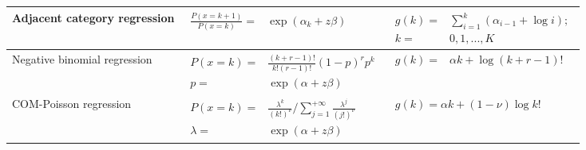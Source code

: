 \documentclass[16pt,presentation]{beamer}
\begin{document}
\begin{frame}
\begin{centering}
{\begin{tabular}{ lll}
  \parbox{0.2\textwidth}{Adjacent category regression }  
   & $\begin{aligned}\frac{P(x = k+1)}{P(x = k)} =& \exp(\alpha_k + z\beta)\end{aligned}$ & $\begin{aligned} g(k) =& \sum_{i = 1}^{k} (\alpha_{i - 1} + \log{i});\\ k =& 0,1,...,K \end{aligned}$\\
    \hline
  \parbox{0.2\textwidth}{Negative binomial regression}&  $\begin{aligned}P(x = k) =& \frac{(k+r-1)!}{k!(r-1)!}(1-p)^r p^k \\ p =& \exp (\alpha + z\beta) \end{aligned}$ & $\begin{aligned} g(k) =& \alpha k + \log{(k+r-1)!} \end{aligned}$\\
\hline
\parbox{0.2\textwidth}{COM-Poisson regression} & $\begin{aligned} P(x = k) =& \frac{\lambda^k}{(k!)^{\nu}} / \sum_{j=1}^{+\infty} \frac{\lambda^j}{(j!)^{\nu}} \\ \lambda =& \exp(\alpha + z \beta) \end{aligned}$ &
$\begin{aligned} g(k) = \alpha k + (1-\nu) \log{k!} \end{aligned}$ \\
  \hline
\end{tabular}
}
\end{centering}
\end{frame}
\end{document}
